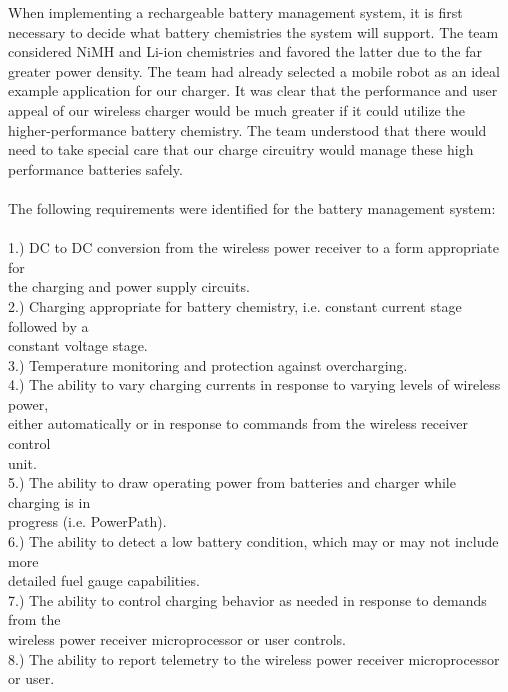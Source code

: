 \documentclass[12pt]{article}
\begin{document}
\indent
When implementing a rechargeable battery management system, it is first necessary to decide what battery chemistries the system will support. The team considered NiMH and Li-ion chemistries and favored the latter due to the far greater power density. The team had already selected a mobile robot as an ideal example application for our charger. It was clear that the performance and user appeal of our wireless charger would be much greater if it could utilize the higher-performance battery chemistry. The team understood that there would need to take special care that our charge circuitry would manage these high performance batteries safely.\\
\hfill \\
The following requirements were identified for the battery management system:\\
\hfill \\
1.) DC to DC conversion from the wireless power receiver to a form appropriate for \\ \indent the charging and power supply circuits.\\
2.) Charging appropriate for battery chemistry, i.e. constant current stage followed by a \\ \indent constant voltage stage.\\
3.) Temperature monitoring and protection against overcharging.\\
4.) The ability to vary charging currents in response to varying levels of wireless power, \\ \indent either automatically or in response to commands from the wireless receiver control \\ \indent unit.\\
5.) The ability to draw operating power from batteries and charger while charging is in \\ \indent progress (i.e. PowerPath).\\
6.) The ability to detect a low battery condition, which may or may not include more \\ \indent detailed fuel gauge capabilities.\\
7.) The ability to control charging behavior as needed in response to demands from the \\ \indent wireless power receiver microprocessor or user controls.\\
8.) The ability to report telemetry to the wireless power receiver microprocessor or user.\\
\hfill \\
\pagebreak
\hfill \\
\end{document}

